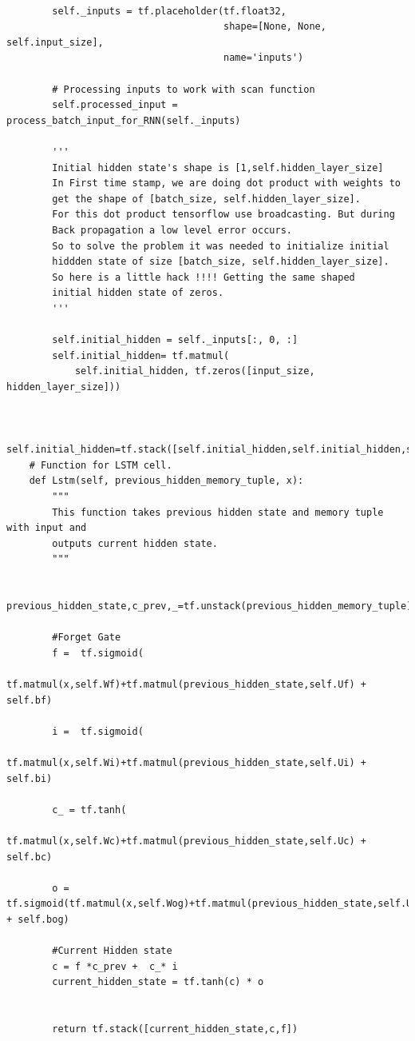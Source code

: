 \documentclass[12pt, letterpaper]{article}
\begin{document}
\begin{verbatim}
        
        self._inputs = tf.placeholder(tf.float32,
                                      shape=[None, None, self.input_size],
                                      name='inputs')

        # Processing inputs to work with scan function
        self.processed_input = process_batch_input_for_RNN(self._inputs)

        '''
        Initial hidden state's shape is [1,self.hidden_layer_size]
        In First time stamp, we are doing dot product with weights to
        get the shape of [batch_size, self.hidden_layer_size].
        For this dot product tensorflow use broadcasting. But during
        Back propagation a low level error occurs.
        So to solve the problem it was needed to initialize initial
        hiddden state of size [batch_size, self.hidden_layer_size].
        So here is a little hack !!!! Getting the same shaped
        initial hidden state of zeros.
        '''

        self.initial_hidden = self._inputs[:, 0, :]
        self.initial_hidden= tf.matmul(
            self.initial_hidden, tf.zeros([input_size, hidden_layer_size]))
        
        
        self.initial_hidden=tf.stack([self.initial_hidden,self.initial_hidden,self.initial_hidden])
    # Function for LSTM cell.
    def Lstm(self, previous_hidden_memory_tuple, x):
        """
        This function takes previous hidden state and memory tuple with input and
        outputs current hidden state.
        """
        
        previous_hidden_state,c_prev,_=tf.unstack(previous_hidden_memory_tuple)

        #Forget Gate
        f =  tf.sigmoid(
            tf.matmul(x,self.Wf)+tf.matmul(previous_hidden_state,self.Uf) + self.bf)
        
        i =  tf.sigmoid(
            tf.matmul(x,self.Wi)+tf.matmul(previous_hidden_state,self.Ui) + self.bi)
          
        c_ = tf.tanh(
            tf.matmul(x,self.Wc)+tf.matmul(previous_hidden_state,self.Uc) + self.bc)
       
        o = tf.sigmoid(tf.matmul(x,self.Wog)+tf.matmul(previous_hidden_state,self.Uog) + self.bog)
            
        #Current Hidden state
        c = f *c_prev +  c_* i
        current_hidden_state = tf.tanh(c) * o


        return tf.stack([current_hidden_state,c,f])


\end{verbatim}
\end{document}
